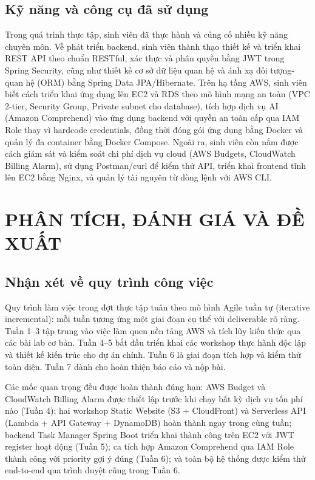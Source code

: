 \documentclass[13pt]{extarticle}
\begin{document}
\subsection{Kỹ năng và công cụ đã sử dụng}

Trong quá trình thực tập, sinh viên đã thực hành và củng cố nhiều kỹ năng
chuyên môn. Về phát triển backend, sinh viên thành thạo thiết kế và triển
khai REST API theo chuẩn RESTful, xác thực và phân quyền bằng JWT trong
Spring Security, cũng như thiết kế cơ sở dữ liệu quan hệ và ánh xạ
đối tượng-quan hệ (ORM) bằng Spring Data JPA/Hibernate. Trên hạ tầng AWS,
sinh viên biết cách triển khai ứng dụng lên EC2 và RDS theo mô hình mạng an
toàn (VPC 2-tier, Security Group, Private subnet cho database), tích hợp
dịch vụ AI (Amazon Comprehend) vào ứng dụng backend với quyền an toàn cấp
qua IAM Role thay vì hardcode credentials, đồng thời đóng gói ứng dụng bằng
Docker và quản lý đa container bằng Docker Compose. Ngoài ra, sinh viên còn
nắm được cách giám sát và kiểm soát chi phí dịch vụ cloud (AWS Budgets,
CloudWatch Billing Alarm), sử dụng Postman/curl để kiểm thử API, triển khai
frontend tĩnh lên EC2 bằng Nginx, và quản lý tài nguyên từ dòng lệnh với AWS
CLI.

\newpage

\section{PHÂN TÍCH, ĐÁNH GIÁ VÀ ĐỀ XUẤT}

\subsection{Nhận xét về quy trình công việc}

Quy trình làm việc trong đợt thực tập tuân theo mô hình Agile tuần tự (iterative
incremental): mỗi tuần tương ứng một giai đoạn cụ thể với deliverable rõ ràng.
Tuần 1--3 tập trung vào việc làm quen nền tảng AWS và tích lũy kiến thức qua
các bài lab cơ bản. Tuần 4--5 bắt đầu triển khai các workshop thực hành độc lập
và thiết kế kiến trúc cho dự án chính. Tuần 6 là giai đoạn tích hợp và kiểm thử
toàn diện. Tuần 7 dành cho hoàn thiện báo cáo và nộp bài.

Các mốc quan trọng đều được hoàn thành đúng hạn: AWS Budget và CloudWatch
Billing Alarm được thiết lập trước khi chạy bất kỳ dịch vụ tốn phí nào (Tuần
4); hai workshop Static Website (S3 + CloudFront) và Serverless API (Lambda +
API Gateway + DynamoDB) hoàn thành ngay trong cùng tuần; backend Task Manager
Spring Boot triển khai thành công trên EC2 với JWT register hoạt động (Tuần
5); ca tích hợp Amazon Comprehend qua IAM Role thành công với priority gợi ý
đúng (Tuần 6); và toàn bộ hệ thống được kiểm thử end-to-end qua trình duyệt
cũng trong Tuần 6.
\end{document}
